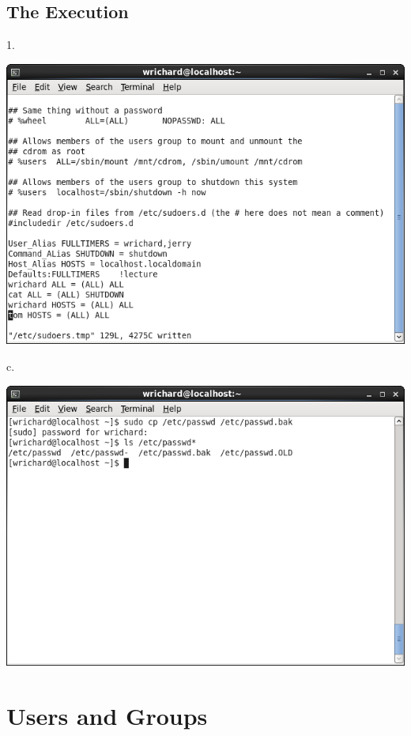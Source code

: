 \documentclass[a4paper,10pt]{article}
\begin{document}
\subsection{The Execution}
1. 
\begin{center}
 \includegraphics[width=\linewidth]{./sudoersfile.png}
\end{center}
c.
\begin{center}
 \includegraphics[width=\linewidth]{./passwd.png}
\end{center}

\section{Users and Groups}
\end{document}
